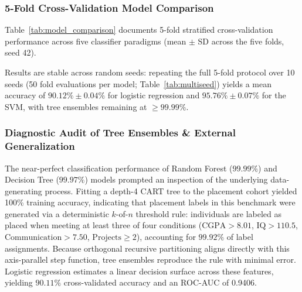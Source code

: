 \documentclass[journal]{IEEEtran}
\begin{document}
\begin{table}[!htbp]
\centering
\caption{Standardized Logistic Regression Placement Model (STAT01; statsmodels MLE with intercept)}
\label{tab:logistic}
\resizebox{\columnwidth}{!}{%

}
\end{table}

\subsubsection{5-Fold Cross-Validation Model Comparison}
Table~\ref{tab:model_comparison} documents 5-fold stratified cross-validation performance across five classifier paradigms (mean $\pm$ SD across the five folds, seed 42).

\begin{table}[!htbp]
\centering
\caption{Stratified 5-Fold Cross-Validation Performance Benchmarks (seed 42)}
\label{tab:model_comparison}
\resizebox{\columnwidth}{!}{%

}
\end{table}

Results are stable across random seeds: repeating the full 5-fold protocol over 10 seeds (50 fold evaluations per model; Table~\ref{tab:multiseed}) yields a mean accuracy of $90.12\% \pm 0.04\%$ for logistic regression and $95.76\% \pm 0.07\%$ for the SVM, with tree ensembles remaining at $\ge 99.99\%$.

\begin{table}[!htbp]
\centering
\caption{Multi-Seed Robustness: 10 Seeds $\times$ 5 Folds (STAT01)}
\label{tab:multiseed}
\resizebox{\columnwidth}{!}{%

}
\end{table}

\subsubsection{Diagnostic Audit of Tree Ensembles \& External Generalization}
\label{sec:diag}
The near-perfect classification performance of Random Forest ($99.99\%$) and Decision Tree ($99.97\%$) models prompted an inspection of the underlying data-generating process. Fitting a depth-4 CART tree to the placement cohort yielded 100\% training accuracy, indicating that placement labels in this benchmark were generated via a deterministic $k$-of-$n$ threshold rule: individuals are labeled as placed when meeting at least three of four conditions ($\text{CGPA} > 8.01$, $\text{IQ} > 110.5$, $\text{Communication} > 7.50$, $\text{Projects} \ge 2$), accounting for $99.92\%$ of label assignments. Because orthogonal recursive partitioning aligns directly with this axis-parallel step function, tree ensembles reproduce the rule with minimal error. Logistic regression estimates a linear decision surface across these features, yielding $90.11\%$ cross-validated accuracy and an ROC-AUC of 0.9406.
\end{document}
